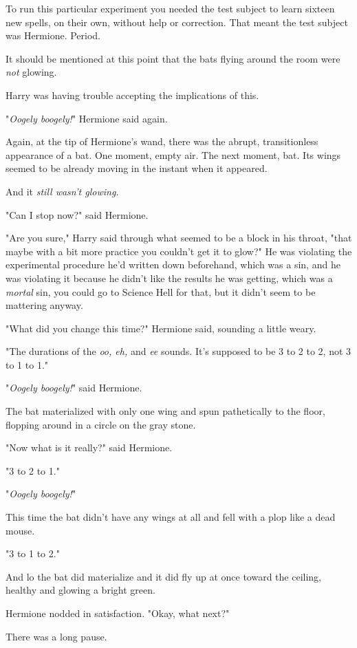 To run this particular experiment you needed the test subject to learn sixteen
new spells, on their own, without help or correction. That meant the test
subject was Hermione. Period.

It should be mentioned at this point that the bats flying around the room were
\emph{not} glowing.

Harry was having trouble accepting the implications of this.

"\emph{Oogely boogely!}" Hermione said again.

Again, at the tip of Hermione's wand, there was the abrupt, transitionless
appearance of a bat. One moment, empty air. The next moment, bat. Its wings
seemed to be already moving in the instant when it appeared.

And it \emph{still wasn't glowing.}

"Can I stop now?" said Hermione.

"Are you sure," Harry said through what seemed to be a block in his throat,
"that maybe with a bit more practice you couldn't get it to glow?" He was
violating the experimental procedure he'd written down beforehand, which was a
sin, and he was violating it because he didn't like the results he was getting,
which was a \emph{mortal} sin, you could go to Science Hell for that, but it
didn't seem to be mattering anyway.

"What did you change this time?" Hermione said, sounding a little weary.

"The durations of the \emph{oo, eh,} and \emph{ee} sounds. It's supposed to be
3 to 2 to 2, not 3 to 1 to 1."

"\emph{Oogely boogely!}" said Hermione.

The bat materialized with only one wing and spun pathetically to the floor,
flopping around in a circle on the gray stone.

"Now what is it really?" said Hermione.

"3 to 2 to 1."

"\emph{Oogely boogely!}"

This time the bat didn't have any wings at all and fell with a plop like a dead
mouse.

"3 to 1 to 2."

And lo the bat did materialize and it did fly up at once toward the ceiling,
healthy and glowing a bright green.

Hermione nodded in satisfaction. "Okay, what next?"

There was a long pause.

